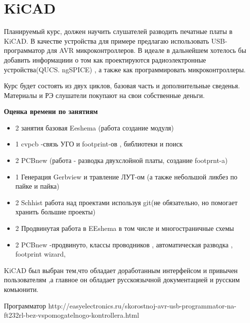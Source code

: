 \part{KiCAD}

Планируемый курс, должен научить слушателей разводить печатные платы в
KiCAD. В качестве устройства для примере предлагаю использовать
USB-программатор для AVR микроконтроллеров. В идеале в дальнейшем
хотелось бы добавить информациии о том как проектируются
радиоэлектронные устройства(QUCS. ngSPICE) , а также как
программировать микроконтроллеры.

Курс будет состоять из двух циклов, базовая часть и дополнительные сведенья. 
Материалы и РЭ слушатели покупают на свои собственные деньги. 

\textbf{Оценка времени по занятиям}
\begin{itemize}
\item 2 занятия базовая Eeshema (работа создание модуля)

\item 1 cvpcb -связь УГО и footprint-ов , библиотеки и поиск

\item 2 PCBnew (работа - разводка двухслойной платы, создание
  footprnt-a)

\item 1 Генерация Gerbview и травление ЛУТ-ом (а также небольшой
  ликбез по пайке и пайка)

\item 2 Schhist работа над проектами используя git(не обязательно, но
  помогает хранить большие проекты)

\item 2 Продвинутая работа в EEshema в том числе и многостраничные
  схемы

\item 2 PCBnew -продвинуто, классы проводников , автоматическая
  разводка , footprint wizard,
\end{itemize}

KiCAD был выбран тем,что обладает доработанным интерфейсом и привычен пользователям ,а главное он обладает русскоязычной документацией и русским комьюнити.

Программатор
http://easyelectronics.ru/skorostnoj-avr-usb-programmator-na-ft232rl-bez-vspomogatelnogo-kontrollera.html
 